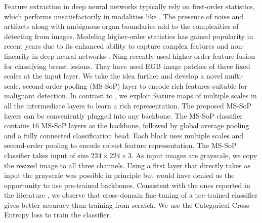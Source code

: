 %
Feature extraction in deep neural networks typically rely on first-order statistics, which performs unsatisfactorily in modalities like \usg. The presence of noise and artifacts along with ambiguous organ boundaries add to the complexities of detecting \gbc from \usg images. 
Modeling higher-order statistics has gained popularity in recent years due to its enhanced ability to capture complex features and non-linearity in deep neural networks \cite{gao2019global, li2017second, zoumpourlis2017non}. %
Ning \etal \cite{ning2020multi} recently used higher-order feature fusion for classifying breast lesions. They have used RGB image patches of three fixed scales at the input layer. We take the idea further and develop a novel multi-scale, second-order pooling (MS-SoP) layer to encode rich features suitable for malignant \gb detection. In contrast to \cite{ning2020multi}, we exploit feature maps of multiple scales in all the intermediate layers to learn a rich representation. The proposed MS-SoP layers can be conveniently plugged into any \cnn backbone.
The MS-SoP classifier contains $16$ MS-SoP layers as the backbone, followed by global average pooling and a fully connected classification head. 
Each block uses multiple scales and second-order pooling to encode robust feature representation. %
The MS-SoP classifier takes input of size $224\times224\times3$. As input \usg images are grayscale, we copy the resized image to all three channels. Using a first layer that directly takes as input the grayscale was possible in principle but would have denied us the opportunity to use pre-trained backbones. Consistent with the ones reported in the literature \cite{alzubaidi2020transferlearning, cheng2017transfer}, we observe that cross-domain fine-tuning of a pre-trained classifier gives better accuracy than training from scratch. 
We use the Categorical Cross-Entropy loss to train the classifier. 

